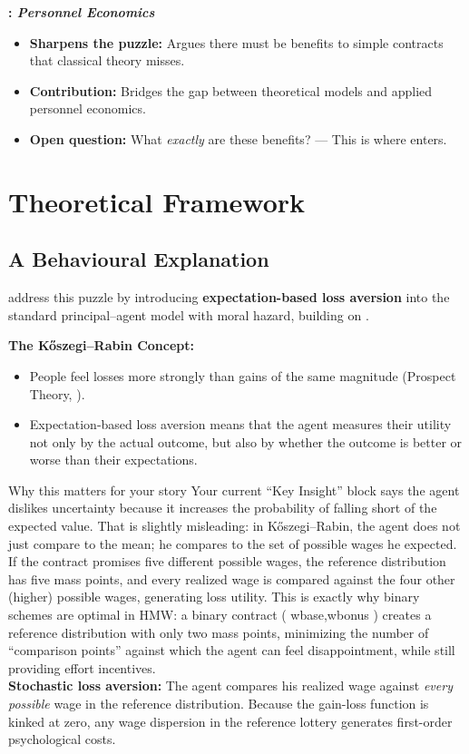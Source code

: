 \documentclass[12pt,a4paper,parskip=half]{scrartcl}
\begin{document}
\medskip

\textbf{\textcite{Lazear2007}: \textit{Personnel Economics}}
\begin{itemize}
    \item \textbf{Sharpens the puzzle:} Argues there must be benefits to simple contracts that classical theory misses.
    \item \textbf{Contribution:} Bridges the gap between theoretical models and applied personnel economics.
    \item \textbf{Open question:} What \emph{exactly} are these benefits? --- This is where \textcite{Herweg2010} enters.
\end{itemize}


\section{Theoretical Framework}

\subsection*{A Behavioural Explanation}

\textcite{Herweg2010} address this puzzle by introducing \textbf{expectation-based loss aversion} into the standard principal--agent model with moral hazard, building on \textcite{Koszegi2006}.

\bigskip

\textbf{The K\H{o}szegi--Rabin Concept:}
\begin{itemize}
    \item People feel losses more strongly than gains of the same magnitude (Prospect Theory, \cite{Kahneman1979}).
    \item Expectation-based loss aversion means that the agent measures their utility not only by the actual outcome, but also by whether the outcome is better or worse than their expectations.
\end{itemize}

Why this matters for your story
Your current “Key Insight” block says the agent dislikes uncertainty because it increases the probability of falling short of the expected value. That is slightly misleading: in Kőszegi–Rabin, the agent does not just compare to the mean; he compares to the set of possible wages he expected. If the contract promises five different possible wages, the reference distribution has five mass points, and every realized wage is compared against the four other (higher) possible wages, generating loss utility. This is exactly why binary schemes are optimal in HMW: a binary contract ( wbase,wbonus ) creates a reference distribution with only two mass points, minimizing the number of “comparison points” against which the agent can feel disappointment, while still providing effort incentives.\\
\textbf{Stochastic loss aversion:} The agent compares his realized wage against \emph{every possible} wage in the reference distribution. Because the gain-loss function is kinked at zero, any wage dispersion in the reference lottery generates first-order psychological costs.
\end{document}
